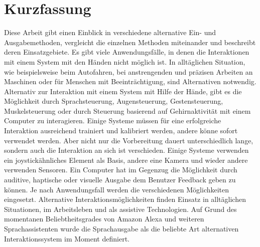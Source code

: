 \chapter{Kurzfassung}
Diese Arbeit gibt einen Einblick in verschiedene alternative Ein- und Ausgabemethoden, vergleicht die einzelnen Methoden miteinander und beschreibt deren Einsatzgebiete.
\newline \newline
Es gibt viele Anwendungsfälle, in denen die Interaktionen mit einem System mit den
Händen nicht möglich ist. In alltäglichen Situation, wie beispielsweise beim Autofahren,
bei anstrengenden und präzisen Arbeiten an Maschinen oder für Menschen mit
Beeinträchtigung, sind Alternativen notwendig.
\newline \newline
Alternativ zur Interaktion mit einem System mit Hilfe der Hände, gibt es die Möglichkeit durch Sprachsteuerung, Augensteuerung, Gestensteuerung, Muskelsteuerung oder durch Steuerung basierend auf Gehirnaktivität mit einem Computer zu interagieren. Einige Systeme müssen für eine erfolgreiche Interaktion ausreichend trainiert und kalibriert werden, andere könne sofort verwendet werden. Aber nicht nur die Vorbereitung dauert unterschiedlich lange, sondern auch die Interaktion an sich ist verschieden. Einige Systeme verwenden ein joystickähnliches Element als Basis, andere eine Kamera und wieder andere verwenden Sensoren.
\newline \newline
Ein Computer hat im Gegenzug die Möglichkeit durch auditive, haptische oder visuelle Ausgabe dem Benutzer Feedback geben zu können. Je nach Anwendungsfall werden die verschiedenen Möglichkeiten eingesetzt.
\newline \newline
Alternative Interaktionsmöglichkeiten finden Einsatz in alltäglichen Situationen, im Arbeitsleben und als assistive Technologien. Auf Grund des momentanen Beliebtheitsgrades von Amazon Alexa und weiteren Sprachassistenten wurde die Sprachausgabe als die beliebte Art alternativen Interaktionssystem im Moment definiert. 